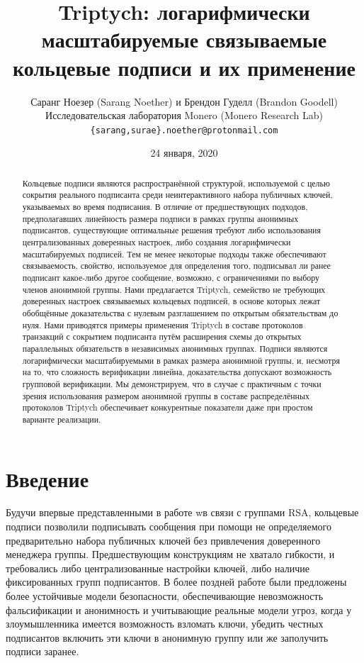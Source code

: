\documentclass{article}
\title{Triptych: логарифмически масштабируемые связываемые кольцевые подписи и их применение}
\author{Саранг Ноезер (Sarang Noether) и Брендон Гуделл (Brandon Goodell) \\ Исследовательская лаборатория Monero (Monero Research Lab) \\ \texttt{\{sarang,surae\}.noether@protonmail.com}}
\date{24 января, 2020}
\theoremstyle{definition}
\begin{document}
\maketitle


\begin{abstract}
Кольцевые подписи являются распространённой структурой, используемой с целью сокрытия реального подписанта среди неинтерактивного набора публичных ключей, указываемых во время подписания. В отличие от предшествующих подходов, предполагавших линейность размера подписи в рамках группы анонимных подписантов, существующие оптимальные решения требуют либо использования централизованных доверенных настроек, либо создания логарифмически масштабируемых подписей. Тем не менее некоторые подходы также обеспечивают связываемость, свойство, используемое для определения того, подписывал ли ранее подписант какое-либо другое сообщение, возможно, с ограничениями по выбору членов анонимной группы. Нами предлагается Triptych, семейство не требующих доверенных настроек связываемых кольцевых подписей, в основе которых лежат обобщённые доказательства с нулевым разглашением по открытым обязательствам до нуля. Нами приводятся примеры применения Triptych в составе протоколов транзакций с сокрытием подписанта путём расширения схемы до открытых параллельных обязательств в независимых анонимных группах. Подписи являются логарифмически масштабируемыми в рамках размера анонимной группы, и, несмотря на то, что сложность верификации линейна, доказательства допускают возможность групповой верификации. Мы демонстрируем, что в случае с практичным с точки зрения использования размером анонимной группы в составе распределённых протоколов Triptych обеспечивает конкурентные показатели даже при простом варианте реализации.
\end{abstract}


\section{Введение}
Будучи впервые представленными в работе \cite{rivest} wв связи с группами RSA, кольцевые подписи позволили подписывать сообщения при помощи не определяемого предварительно набора публичных ключей без привлечения доверенного менеджера группы. Предшествующим конструкциям не хватало гибкости, и требовались либо централизованные настройки ключей, либо наличие фиксированных групп подписантов. В более поздней работе \cite{bender} были предложены более устойчивые модели безопасности, обеспечивающие невозможность фальсификации и анонимность и учитывающие реальные модели угроз, когда у злоумышленника имеется возможность взломать ключи, убедить честных подписантов включить эти ключи в анонимную группу или же заполучить подписи заранее.
\end{document}
